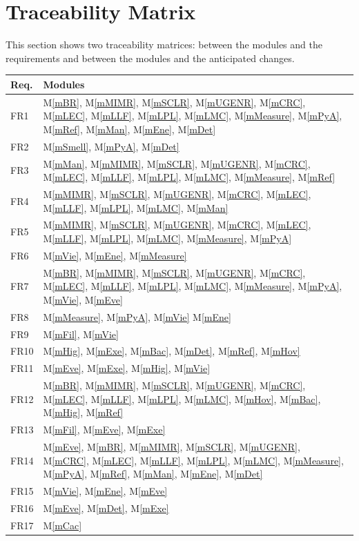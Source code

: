 \documentclass[12pt, titlepage]{article}
\newcommand{\mref}[1]{M\ref{#1}}
\begin{document}
\section{Traceability Matrix} \label{SecTM}

This section shows two traceability matrices: between the modules and the
requirements and between the modules and the anticipated changes.

\begin{table}[H]
  \centering
  \begin{tabular}{p{} p{}}
    \toprule
    \textbf{Req.} & \textbf{Modules}\\
    \midrule
    FR1 & \mref{mBR}, \mref{mMIMR}, \mref{mSCLR}, \mref{mUGENR}, \mref{mCRC}, \mref{mLEC}, \mref{mLLF}, \mref{mLPL}, \mref{mLMC}, \mref{mMeasure}, \mref{mPyA}, \mref{mRef}, \mref{mMan}, \mref{mEne}, \mref{mDet} \\
    FR2 & \mref{mSmell}, \mref{mPyA}, \mref{mDet} \\
    FR3 & \mref{mMan},  \mref{mMIMR}, \mref{mSCLR}, \mref{mUGENR}, \mref{mCRC}, \mref{mLEC}, \mref{mLLF}, \mref{mLPL}, \mref{mLMC}, \mref{mMeasure}, \mref{mRef}\\
    FR4 & \mref{mMIMR}, \mref{mSCLR}, \mref{mUGENR}, \mref{mCRC}, \mref{mLEC}, \mref{mLLF}, \mref{mLPL}, \mref{mLMC}, \mref{mMan} \\
    FR5 & \mref{mMIMR}, \mref{mSCLR}, \mref{mUGENR}, \mref{mCRC}, \mref{mLEC}, \mref{mLLF}, \mref{mLPL}, \mref{mLMC}, \mref{mMeasure}, \mref{mPyA}\\
    FR6 & \mref{mVie}, \mref{mEne}, \mref{mMeasure} \\
    FR7 & \mref{mBR}, \mref{mMIMR}, \mref{mSCLR}, \mref{mUGENR}, \mref{mCRC}, \mref{mLEC}, \mref{mLLF}, \mref{mLPL}, \mref{mLMC}, \mref{mMeasure}, \mref{mPyA}, \mref{mVie}, \mref{mEve}\\
    FR8 & \mref{mMeasure}, \mref{mPyA}, \mref{mVie} \mref{mEne} \\
    FR9 & \mref{mFil}, \mref{mVie}\\
    FR10 & \mref{mHig}, \mref{mExe}, \mref{mBac}, \mref{mDet}, \mref{mRef}, \mref{mHov} \\
    FR11 & \mref{mEve}, \mref{mExe}, \mref{mHig}, \mref{mVie} \\
    FR12 & \mref{mBR}, \mref{mMIMR}, \mref{mSCLR}, \mref{mUGENR}, \mref{mCRC}, \mref{mLEC}, \mref{mLLF}, \mref{mLPL}, \mref{mLMC}, \mref{mHov}, \mref{mBac}, \mref{mHig}, \mref{mRef} \\
    FR13 & \mref{mFil}, \mref{mEve}, \mref{mExe} \\
    FR14 & \mref{mEve}, \mref{mBR}, \mref{mMIMR}, \mref{mSCLR}, \mref{mUGENR}, \mref{mCRC}, \mref{mLEC}, \mref{mLLF}, \mref{mLPL}, \mref{mLMC}, \mref{mMeasure}, \mref{mPyA}, \mref{mRef}, \mref{mMan}, \mref{mEne}, \mref{mDet} \\
    FR15 & \mref{mVie}, \mref{mEne}, \mref{mEve} \\
    FR16 & \mref{mEve}, \mref{mDet}, \mref{mExe} \\
    FR17 & \mref{mCac}\\


\end{tabular}
\end{table}
\end{document}
